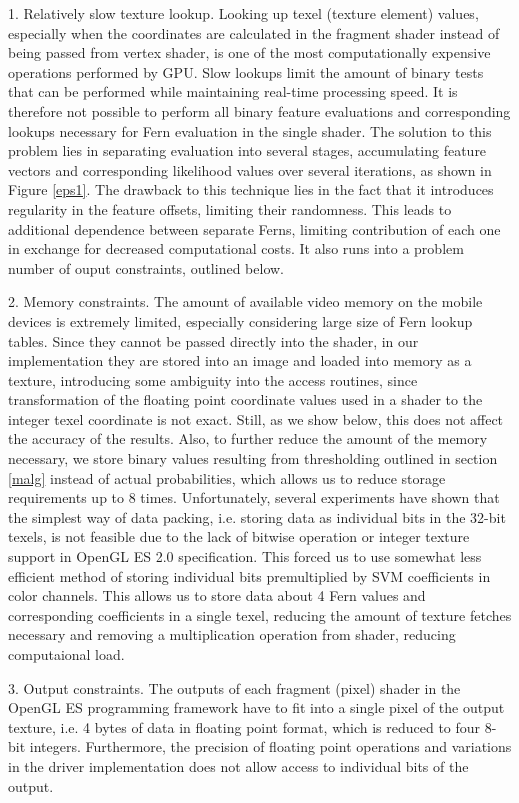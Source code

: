 \documentclass[10pt,twocolumn, a4paper]{article}
\begin{document}
1.	Relatively slow texture lookup. Looking up texel (texture element) values, especially when the coordinates are calculated in the fragment shader instead of being passed from vertex shader, is one of the most computationally expensive operations performed by GPU. Slow lookups limit the amount of binary tests that can be performed while maintaining real-time processing speed. It is therefore not possible to perform all binary feature evaluations and corresponding lookups necessary for Fern evaluation in the single shader.  The solution to this problem lies in separating evaluation into several stages, accumulating feature vectors and corresponding likelihood values over several iterations, as shown in Figure \ref{eps1}. The drawback to this technique lies in the fact that it introduces regularity in the feature offsets, limiting their randomness. This leads to additional dependence between separate Ferns, limiting contribution of each one in exchange for decreased computational costs. It also runs into a problem number of ouput constraints, outlined below. 

2.	 Memory constraints. The amount of available video memory on the mobile devices is extremely limited, especially considering large size of Fern lookup tables. Since they cannot be passed directly into the shader, in our implementation they are stored into an image and loaded into memory as a texture, introducing some ambiguity into the access routines, since transformation of the floating point coordinate values used in a shader to the integer texel coordinate is not exact. Still, as we show below, this does not affect the accuracy of the results. Also, to further reduce the amount of the memory necessary, we store binary values resulting from thresholding outlined in section \ref{malg} instead of actual probabilities, which allows us to reduce storage requirements up to 8 times. Unfortunately, several experiments have shown that the simplest way of data packing, i.e. storing data as individual bits in the 32-bit texels, is not feasible due to the lack of bitwise operation or integer texture support in OpenGL ES 2.0 specification. This forced us to use somewhat less efficient method of storing individual bits premultiplied by SVM coefficients in color channels. This allows us to store data about 4 Fern values and corresponding coefficients in a single texel, reducing the amount of texture fetches necessary and removing a multiplication operation from shader, reducing computaional load.

3.	Output constraints. The outputs of each fragment (pixel) shader in the OpenGL ES programming framework have to fit into a single pixel of the output texture, i.e. 4 bytes of data in floating point format, which is reduced to four 8-bit integers. Furthermore, the precision of floating point operations and variations in the driver implementation does not allow access to individual bits of the output. 
\end{document}
